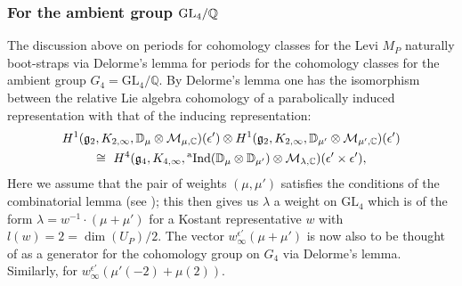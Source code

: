 \documentclass[11pt]{amsart}
\newcommand{\D}{\mathbb D}
\newcommand{\GL}{\mathrm{GL}}
\newcommand{\aInd}{{}^{\rm a}{\rm Ind}}
\begin{document}
\subsubsection{For the ambient group ${\rm GL}_4/\mathbb{Q}$}
The discussion above on periods for cohomology classes for the Levi $M_P$ naturally boot-straps via Delorme's lemma 
for periods for the cohomology classes for the ambient group $G_4 = \GL_4/\mathbb{Q}.$
By Delorme's lemma one has the isomorphism between the relative Lie algebra cohomology of a parabolically induced representation 
with that of the inducing representation:
\begin{multline*} 
H^{1}(\mathfrak{g}_2, K_{2, \infty}, \mathbb{D}_{\mu} \otimes \mathcal{M}_{\mu, \mathbb{C}})(\epsilon') 
\otimes H^{1}(\mathfrak{g}_2, K_{2, \infty}, \mathbb{D}_{\mu'} \otimes \mathcal{M}_{\mu', \mathbb{C}})(\epsilon')  \\
\cong \ 
H^4(\mathfrak{g}_4, K_{4,\infty}, \aInd(\D_\mu \otimes \D_{\mu'}) \otimes \mathcal{M}_{\lambda, \mathbb{C}})(\epsilon' \times \epsilon'),	
\end{multline*}
Here we assume that the pair of weights $(\mu, \mu')$ satisfies the conditions of the combinatorial lemma (see \cite[Lem.\,7.14]{harder-raghuram}); 
this then gives us $\lambda$ a weight on $\GL_4$ which is of the form 
$\lambda = w^{-1}\cdot(\mu+\mu')$ for a Kostant representative $w$ with $l(w) = 2 = \dim(U_P)/2$. 
The vector $w^{\epsilon'}_{\infty}(\mu + \mu')$ is now also to be thought of as a generator for the 
cohomology group on $G_4$ via Delorme's lemma. Similarly, for $w^{\epsilon'}_{\infty}(\mu'(-2) + \mu(2))$. 
\end{document}
